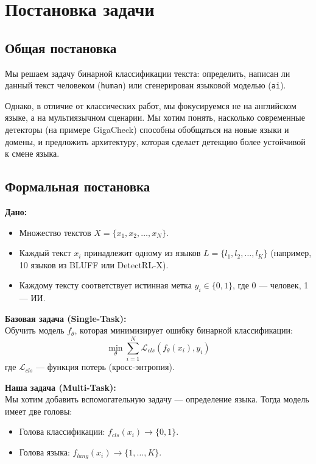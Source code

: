 \documentclass{article}
\begin{document}
\section{Постановка задачи}
\subsection{Общая постановка}
Мы решаем задачу бинарной классификации текста: определить, написан ли данный текст человеком (\texttt{human}) или сгенерирован языковой моделью (\texttt{ai}). 

Однако, в отличие от классических работ, мы фокусируемся не на английском языке, а на мультиязычном сценарии. Мы хотим понять, насколько современные детекторы (на примере GigaCheck) способны обобщаться на новые языки и домены, и предложить архитектуру, которая сделает детекцию более устойчивой к смене языка.

\subsection{Формальная постановка}

\textbf{Дано:}
\begin{itemize}
    \item Множество текстов \(X = \{x_1, x_2, \dots, x_N\}\).
    \item Каждый текст \(x_i\) принадлежит одному из языков \(L = \{l_1, l_2, \dots, l_K\}\) (например, 10 языков из BLUFF или DetectRL-X).
    \item Каждому тексту соответствует истинная метка \(y_i \in \{0, 1\}\), где 0 — человек, 1 — ИИ.
\end{itemize}

\textbf{Базовая задача (Single-Task):} \\
Обучить модель \(f_\theta\), которая минимизирует ошибку бинарной классификации:
\begin{equation}
    \min_\theta \sum_{i=1}^{N} \mathcal{L}_{cls}(f_\theta(x_i), y_i)
\end{equation}
где \(\mathcal{L}_{cls}\) — функция потерь (кросс-энтропия).

\textbf{Наша задача (Multi-Task):} \\
Мы хотим добавить вспомогательную задачу — определение языка. Тогда модель имеет две головы:
\begin{itemize}
    \item Голова классификации: \(f_{cls}(x_i) \rightarrow \{0, 1\}\).
    \item Голова языка: \(f_{lang}(x_i) \rightarrow \{1, \dots, K\}\).
\end{itemize}
\end{document}
